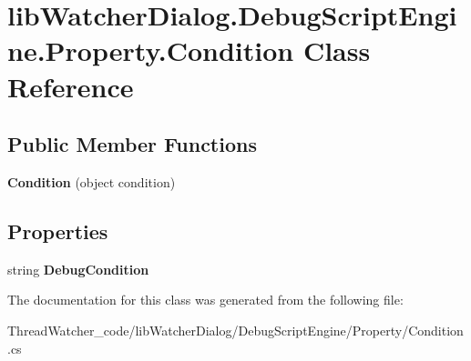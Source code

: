 \hypertarget{classlib_watcher_dialog_1_1_debug_script_engine_1_1_property_1_1_condition}{\section{lib\+Watcher\+Dialog.\+Debug\+Script\+Engine.\+Property.\+Condition Class Reference}
\label{classlib_watcher_dialog_1_1_debug_script_engine_1_1_property_1_1_condition}
}
\subsection*{Public Member Functions}
\begin{DoxyCompactItemize}
\item 
\hypertarget{classlib_watcher_dialog_1_1_debug_script_engine_1_1_property_1_1_condition_aa3c4f526fb9b2af65571534f1d420f45}{{\bfseries Condition} (object condition)}\label{classlib_watcher_dialog_1_1_debug_script_engine_1_1_property_1_1_condition_aa3c4f526fb9b2af65571534f1d420f45}

\end{DoxyCompactItemize}
\subsection*{Properties}
\begin{DoxyCompactItemize}
\item 
\hypertarget{classlib_watcher_dialog_1_1_debug_script_engine_1_1_property_1_1_condition_a6fa9dbdeb445d1ca3234bb6f34cdf6e9}{string {\bfseries Debug\+Condition}}\label{classlib_watcher_dialog_1_1_debug_script_engine_1_1_property_1_1_condition_a6fa9dbdeb445d1ca3234bb6f34cdf6e9}

\end{DoxyCompactItemize}


The documentation for this class was generated from the following file\+:\begin{DoxyCompactItemize}
\item 
Thread\+Watcher\+\_\+code/lib\+Watcher\+Dialog/\+Debug\+Script\+Engine/\+Property/Condition.\+cs\end{DoxyCompactItemize}
